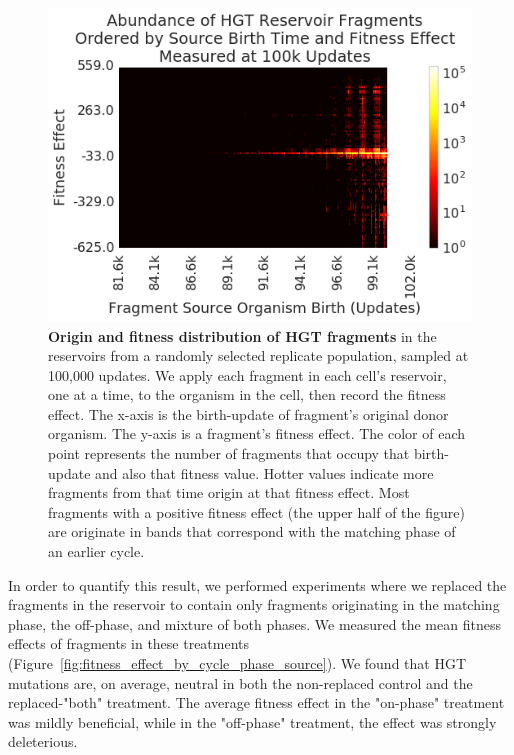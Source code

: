 \documentclass[PhD]{msu-thesis}
\begin{document}
\begin{figure}[h!]
\begin{center}
\includegraphics[width=0.7\columnwidth]{figures/HGT/fitness_effect_heatmap.png}
\caption{\textbf{Origin and fitness distribution of HGT fragments} in the reservoirs from a randomly selected replicate population, sampled at 100,000 updates. We apply each fragment in each cell's reservoir, one at a time, to the organism in the cell, then record the fitness effect. The x-axis is the birth-update of fragment's original donor organism. The y-axis is a fragment's fitness effect. The color of each point represents the number of fragments that occupy that birth-update and also that fitness value. Hotter values indicate more fragments from that time origin at that fitness effect. Most fragments with a positive fitness effect (the upper half of the figure) are originate in bands that correspond with the matching phase of an earlier cycle. 
}\label{fig:fitness_effect_heatmap}
\end{center}
\end{figure}


In order to quantify this result, we performed experiments where we replaced the fragments in the reservoir to contain only fragments originating in the matching phase, the off-phase, and mixture of both phases. We measured the mean fitness 
effects of fragments in these treatments (Figure~\ref{fig:fitness_effect_by_cycle_phase_source}). We found that HGT mutations are, on average, neutral in both the non-replaced control and the replaced-"both" treatment. The average fitness effect in the "on-phase" treatment was mildly beneficial, while in the "off-phase" treatment, the effect was strongly deleterious. 
\end{document}
